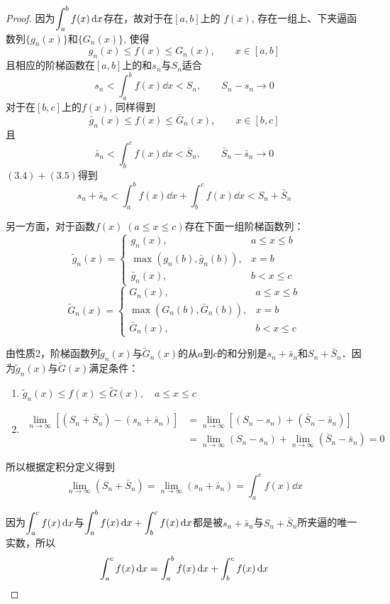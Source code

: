 \begin{proof}
因为$\displaystyle\int^b_a f(x)\,{\rm d} x$存在，故对于在$[a,b]$上的
$f(x)$, 存在一组上、下夹逼函数列$\{g_n(x)\}$和$\{G_n(x)\}$, 使得
\[g_n (x) \le f (x) \le G_n (x),\qquad x\in [a,b]\]
且相应的阶梯函数在$[a,b]$上的和$s_n$与$S_n$适合
\begin{equation}
    s_n<\int^b_a f(x)\dd x<S_n,\qquad S_n-s_n\to 0
\end{equation}
对于在$[b,c]$上的$f(x)$, 同样得到
\[\bar g_n (x) \le f (x) \le \bar G_n (x),\qquad x\in [b,c]\]
且
\begin{equation}
    \bar  s_n<\int^c_b f(x)\dd x<\bar S_n,\qquad \bar S_n-\bar s_n\to 0
\end{equation}
$(3.4)+(3.5)$得到
\begin{equation}
    s_n+ \bar  s_n<\int^b_a f(x)\dd x+\int^c_b f(x)\dd x<S_n+\bar S_n
\end{equation}

另一方面，对于函数$f(x)\; (a\le x\le c)$存在下面一组阶梯函数列：
\[\tilde g_n(x)=\begin{cases}
    g_n(x),  &  a\le x\le b\\
    \max\left(g_n(b), \bar g_n(b)\right),  &  x=b\\
    \bar g_n(x), & b<x\le c
\end{cases}\]
\[\tilde G_n(x)=\begin{cases}
    G_n(x),  &  a\le x\le b\\
    \max\left(G_n(b), \bar G_n(b)\right),  &  x=b\\
    \bar G_n(x), & b<x\le c
\end{cases}\]

由性质2，阶梯函数列$\tilde g_n(x)$与$\tilde G_n(x)$的从$a$到$c$的和分别是$s_n+\bar s_n$和$S_n+\bar S_n$．因为$\tilde g_n(x)$与$\tilde G(x)$满足条件：
\begin{enumerate}
    \item $\tilde g_n(x)\le f(x)\le \tilde G(x),\quad a\le x\le c$
    \item \[\begin{split}
    \lim_{n\to\infty}\left[(S_n+\bar S_n)-(s_n+\bar s_n)\right]&=\lim_{n\to\infty}\left[(S_n-s_n)+(\bar S_n-\bar s_n)\right]\\
    &=\lim_{n\to\infty}(S_n-s_n)+\lim_{n\to\infty}(\bar S_n-\bar s_n)=0
    \end{split}\]
\end{enumerate}
所以根据定积分定义得到
\[\lim_{n\to\infty}(S_n+\bar S_n)=\lim_{n\to\infty}(s_n+\bar s_n)=\int^c_a f(x)\dd x \]

因为$\displaystyle\int^c_a f(x)\,{\rm d} x $与$\displaystyle\int^b_a f(x)\,{\rm d} x +\displaystyle\int^c_b f(x)\,{\rm d} x $都是被$s_n+\bar s_n$与$S_n+\bar S_n$所夹逼的唯一实数，所以
\[\displaystyle\int^c_a f(x)\,{\rm d} x=\displaystyle\int^b_a f(x)\,{\rm d} x +\displaystyle\int^c_b f(x)\,{\rm d} x\]
\end{proof}

